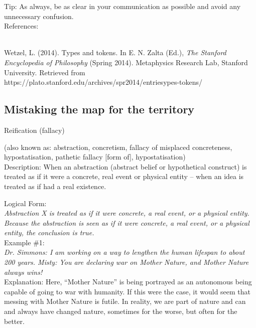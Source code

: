\documentclass[a4paper,12pt,single,pdftex]{scrartcl}
\begin{document}
    
      Tip: As always, be as clear in your communication as possible and avoid any unnecessary confusion.
    \\

    References:

    
      
        
      \\

      
        
          Wetzel, L. (2014). Types and tokens. In E. N. Zalta (Ed.), {\it The Stanford Encyclopedia of Philosophy} (Spring 2014). Metaphysics Research Lab, Stanford University. Retrieved from https://plato.stanford.edu/archives/spr2014/entriesypes-tokens/
        
      
    
  \subsection{Mistaking the map for the territory}


Reification (fallacy)
    
      (also known as: abstraction, concretism, fallacy of misplaced concreteness, hypostatisation, pathetic fallacy [form of], hypostatisation)
    \\

  
    Description: When an abstraction (abstract belief or hypothetical construct) is treated as if it were a concrete, real event or physical entity -- when an idea is treated as if had a real existence.

    
      Logical Form:
    \\

    
      {\em Abstraction X is treated as if it were concrete, a real event, or a physical entity. \newline
Because the abstraction is seen as if it were concrete, a real event, or a physical entity, the conclusion is true.}
    \\

    
      Example \#1:
    \\

    
      {\em Dr. Simmons: I am working on a way to lengthen the human lifespan to about 200 years. \newline
Misty: You are declaring war on Mother Nature, and Mother Nature always wins!}
    \\

    
      Explanation: Here, “Mother Nature” is being portrayed as an autonomous being capable of going to war with humanity. If this were the case, it would seem that messing with Mother Nature is futile. In reality, we are part of nature and can and always have changed nature, sometimes for the worse, but often for the better.
    \\
\end{document}
